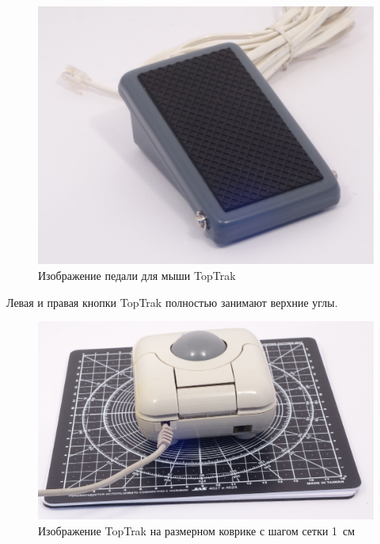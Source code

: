 \documentclass[11pt, a4paper]{article}
\begin{document}
\begin{figure}[h]
    \centering
    \includegraphics[scale=0.55]{1990_kraft_toptrack/2.7.jpg}
    \caption{Изображение педали для мыши TopTrak}
    \label{fig:TopTrakPedal}
\end{figure}


Левая и правая кнопки TopTrak полностью занимают верхние углы.

\begin{figure}[h]
    \centering
    \includegraphics[scale=0.35]{1990_kraft_toptrack/2.6.jpg}
    \caption{Изображение TopTrak на размерном коврике с шагом сетки 1~см}
    \label{fig:TopTrakSize}
\end{figure}
\end{document}
